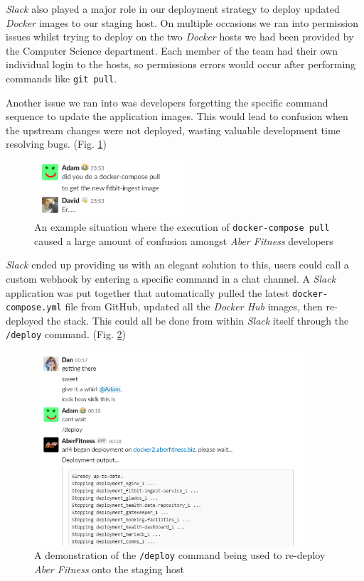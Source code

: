 \textit{Slack} also played a major role in our deployment strategy to deploy updated \textit{Docker} images to our staging host. On multiple occasions we ran into permission issues whilst trying to deploy on the two \textit{Docker} hosts we had been provided by the Computer Science department. Each member of the team had their own individual login to the hosts, so permissions errors would occur after performing commands like \lstinline{git pull}. 

Another issue we ran into was developers forgetting the specific command sequence to update the application images. This would lead to confusion when the upstream changes were not deployed, wasting valuable development time resolving bugs. (Fig. \ref{fig:david_being_a_dumbass})

\begin{figure}[H]
    \centering
    \includegraphics[width=0.5\textwidth]{Images/aberfitness_slack_bot_reason_why.png}
    \caption{An example situation where the execution of \lstinline{docker-compose pull} caused a large amount of confusion amongst \textit{Aber Fitness} developers}
    \label{fig:david_being_a_dumbass}
\end{figure}

\textit{Slack} ended up providing us with an elegant solution to this, users could call a custom webhook by entering a specific command in a chat channel. A \textit{Slack} application was put together that automatically pulled the latest \lstinline{docker-compose.yml} file from GitHub, updated all the \textit{Docker Hub} images, then re-deployed the stack. This could all be done from within \textit{Slack} itself through the \lstinline{/deploy} command. (Fig. \ref{fig:slack_bot})

\begin{figure}[H]
    \centering
    \includegraphics[width=0.9\textwidth]{Images/aberfitness_slack_bot.png}
    \caption{A demonstration of the \lstinline{/deploy} command being used to re-deploy \textit{Aber Fitness} onto the staging host}
    \label{fig:slack_bot}
\end{figure}

